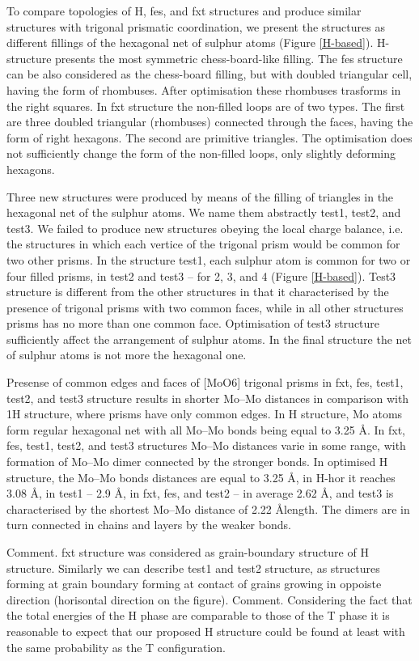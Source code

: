 \documentclass[a4paperm]{article}
\begin{document}
To compare topologies of H, fes, and fxt structures and produce similar structures with trigonal prismatic coordination, we present the structures as different fillings of the hexagonal net of sulphur atoms (Figure \ref{H-based}).
H-structure presents the most symmetric chess-board-like filling.
The fes structure can be also considered as the chess-board filling, but with doubled triangular cell, having the form of rhombuses.
After optimisation these rhombuses trasforms in the right squares.
In fxt structure the non-filled loops are of two types.
The first are three doubled triangular (rhombuses) connected through the faces, having the form of right hexagons.
The second are primitive triangles.
The optimisation does not sufficiently change the form of the non-filled loops, only slightly deforming hexagons.


Three new structures were produced by means of the filling of triangles in the hexagonal net of the sulphur atoms.
We name them abstractly test1, test2, and test3.
We failed to produce new structures obeying the local charge balance, i.e. the structures in which each vertice of the trigonal prism would be common for two other prisms.
In the structure test1, each sulphur atom is common for two or four filled prisms, in test2 and test3 – for 2, 3, and 4 (Figure \ref{H-based}).
Test3 structure is different from the other structures in that it characterised by the presence of trigonal prisms with two common faces, while in all other structures prisms has no more than one common face.
Optimisation of test3 structure sufficiently affect the arrangement of sulphur atoms.
In the final structure the net of sulphur atoms is not more the hexagonal one.

Presense of common edges and faces of [MoO6] trigonal prisms in fxt, fes, test1, test2, and test3 structure results in shorter Mo--Mo distances in comparison with 1H structure, where prisms have only common edges.
In H structure, Mo atoms form regular hexagonal net with all Mo--Mo bonds being equal to 3.25 \AA.
In fxt, fes, test1, test2, and test3 structures Mo--Mo distances varie in some range, with formation of Mo--Mo dimer connected by the stronger bonds.
In optimised H structure, the Mo--Mo bonds distances are equal to 3.25 \AA, in H-hor it reaches 3.08 \AA, in test1 -- 2.9 \AA, in fxt, fes, and test2 -- in average 2.62 \AA, and test3 is characterised by the shortest Mo--Mo distance of 2.22 \AA length. 
The dimers are in turn connected in chains and layers by the weaker bonds.

Comment. fxt structure was considered as grain-boundary structure of H structure. Similarly we can describe test1 and test2 structure, as structures forming at grain boundary forming at contact of grains growing in oppoiste direction (horisontal direction on the figure).
Comment. Considering the fact that the total energies of the H phase are comparable to those of the T phase it is reasonable to expect that our proposed H structure could be found at least with the same probability as the T configuration.
\end{document}
